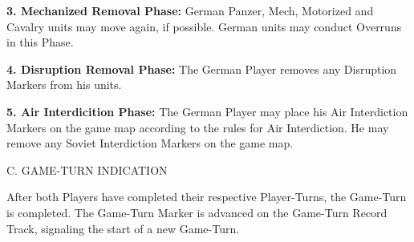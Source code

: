 \textbf{3. Mechanized Removal Phase:} German Panzer, Mech, Motorized and Cavalry units may move again, if possible. German units may conduct Overruns in this Phase.

\textbf{4. Disruption Removal Phase:} The German Player removes any Disruption Markers from his units.

\textbf{5. Air Interdicition Phase:} The German Player may place his Air Interdiction Markers on the game map according to the rules for Air Interdiction. He may remove any Soviet Interdiction Markers on the game map.

C. GAME-TURN INDICATION

After both Players have completed their respective Player-Turns, the Game-Turn is completed. The Game-Turn Marker is advanced on the Game-Turn Record Track, signaling the start of a new Game-Turn.